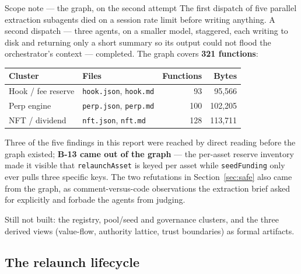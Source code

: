 \documentclass[11pt,a4paper]{article}
\newcommand{\code}[1]{\texttt{\small #1}}
\begin{document}
\begin{notebox}{Scope note --- the graph, on the second attempt}
The first dispatch of five parallel extraction subagents died on a session rate limit
before writing anything. A second dispatch --- three agents, on a smaller model, staggered,
each writing to disk and returning only a short summary so its output could not flood the
orchestrator's context --- completed. The graph covers \textbf{321 functions}:

\begin{center}\small
\begin{tabular}{@{}llrr@{}}
\toprule
\textbf{Cluster} & \textbf{Files} & \textbf{Functions} & \textbf{Bytes} \\
\midrule
Hook / fee reserve & \code{hook.json}, \code{hook.md} & 93 & 95{,}566 \\
Perp engine & \code{perp.json}, \code{perp.md} & 100 & 102{,}205 \\
NFT / dividend & \code{nft.json}, \code{nft.md} & 128 & 113{,}711 \\
\bottomrule
\end{tabular}
\end{center}

\noindent Three of the five findings in this report were reached by direct reading before
the graph existed; \textbf{B-13 came out of the graph} --- the per-asset reserve inventory
made it visible that \code{relaunchAsset} is keyed per asset while \code{seedFunding} only
ever pulls three specific keys. The two refutations in Section~\ref{sec:safe} also came
from the graph, as comment-versus-code observations the extraction brief asked for
explicitly and forbade the agents from judging.

Still not built: the registry, pool/seed and governance clusters, and the three derived
views (value-flow, authority lattice, trust boundaries) as formal artifacts.
\end{notebox}

\subsection{The relaunch lifecycle}
\end{document}
